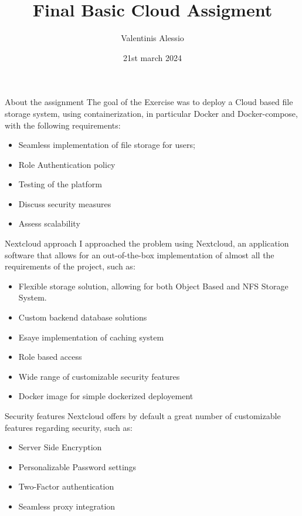 \documentclass[11pt]{beamer}
\title{Final Basic Cloud Assigment}
\author{Valentinis Alessio}
\institute{Università degli Studi di Trieste}
\date{21st march 2024}
\begin{document}
\begin{frame}
	\titlepage
\end{frame}

\begin{frame}{About the assignment}
	The goal of the Exercise was to deploy a Cloud based file storage system, using containerization, in particular Docker and Docker-compose, with the following requirements:
	\begin{itemize}
		\item Seamless implementation of file storage for users;
		\item Role Authentication policy
		\item Testing of the platform
		\item Discuss security measures
		\item Assess scalability
	\end{itemize}
\end{frame}

\begin{frame}{Nextcloud approach}
	I approached the problem using Nextcloud, an application software that allows for an out-of-the-box implementation of almost all the requirements of the project, such as:
	\begin{itemize}
		\item Flexible storage solution, allowing for both Object Based and NFS Storage System.
		\item Custom backend database solutions
		\item Esaye implementation of caching system
		\item Role based access
		\item Wide range of customizable security features
		\item Docker image for simple dockerized deployement
	\end{itemize}
\end{frame}

\begin{frame}{Security features}
	Nextcloud offers by default a great number of customizable features regarding security, such as:
	\begin{itemize}
		\item Server Side Encryption
		\item Personalizable Password settings
		\item Two-Factor authentication
		\item Seamless proxy integration
	\end{itemize}
\end{frame}
\end{document}

